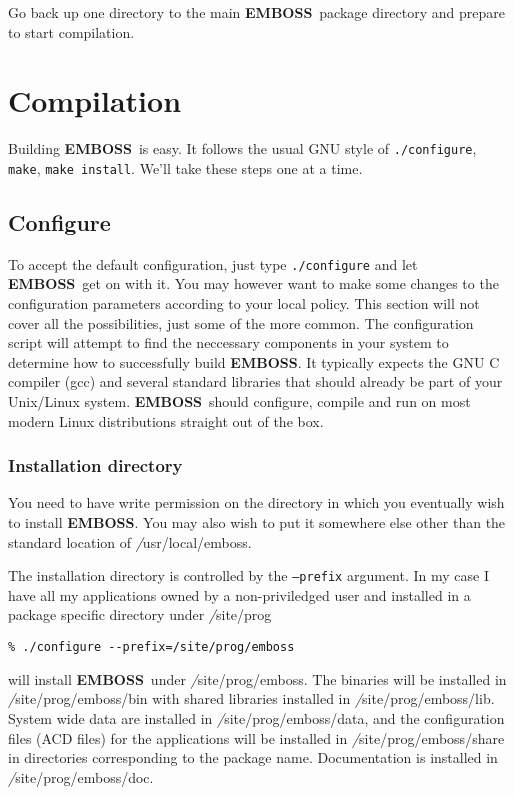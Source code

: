 \documentclass{report}
\newcommand{\ilcomm}[1]{{\tt #1}}
\newcommand{\filename}[1]{{\sf\textsl #1}}
\newcommand{\EMBOSS}{{\sf\bfseries EMBOSS}}
\begin{document}
Go back up one directory to the main \EMBOSS\ package directory and prepare to start compilation.

\section{Compilation}

Building \EMBOSS\ is easy. It follows the usual GNU style of \ilcomm{./configure}, \ilcomm{make}, \ilcomm{make install}. We'll take these steps one at a time.

\subsection{Configure}

To accept the default configuration, just type \ilcomm{./configure} and let \EMBOSS\ get on with it. You may however want to make some changes to the configuration parameters according to your local policy. This section will not cover all the possibilities, just some of the more common. The configuration script will attempt to find the neccessary components in your system to determine how to successfully build \EMBOSS. It typically expects the GNU C compiler (gcc) and several standard libraries that should already be part of your Unix/Linux system. \EMBOSS\ should configure, compile and run on most modern Linux distributions straight out of the box.

\subsubsection{Installation directory}

You need to have write permission on the directory in which you eventually wish to install \EMBOSS. You may also wish to put it somewhere else other than the standard location of \filename{/usr/local/emboss}.

The installation directory is controlled by the \ilcomm{--prefix} argument. In my case I have all my applications owned by a non-priviledged user and installed in a package specific directory under \filename{/site/prog}
\begin{verbatim}
% ./configure --prefix=/site/prog/emboss
\end{verbatim}
will install \EMBOSS\ under \filename{/site/prog/emboss}. The binaries will be installed in \filename{/site/prog/emboss/bin} with shared libraries installed in \filename{/site/prog/emboss/lib}. System wide data are installed in \filename{/site/prog/emboss/data}, and the configuration files (ACD files) for the applications will be installed in \filename{/site/prog/emboss/share} in directories corresponding to the package name. Documentation is installed in  \filename{/site/prog/emboss/doc}.
\end{document}
